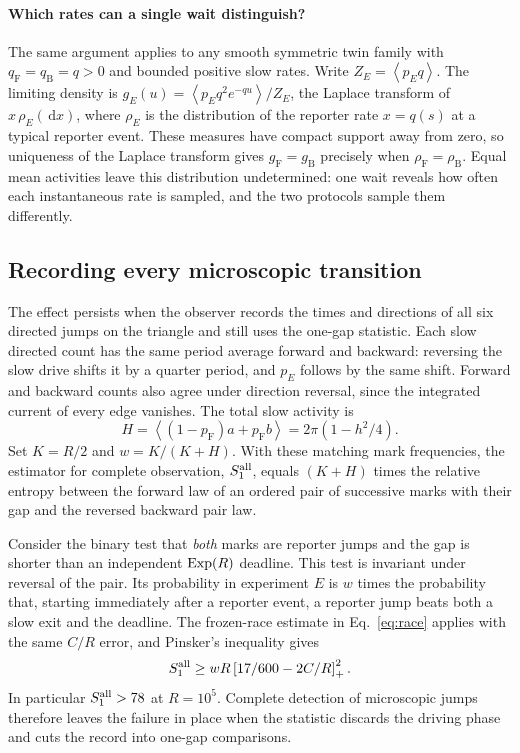 \documentclass[11pt,a4paper]{article}
\newcommand{\av}[1]{\left\langle #1\right\rangle}
\newcommand{\F}{\mathrm F}
\newcommand{\B}{\mathrm B}
\newcommand{\pos}[1]{\left[#1\right]_+}
\newcommand{\dd}{\,\mathrm d}
\begin{document}
\paragraph{Which rates can a single wait distinguish?} The same argument applies to any smooth symmetric twin family with $q_\F=q_\B=q>0$ and bounded positive slow rates. Write $Z_E=\av{p_E q}$. The limiting density is $g_E(u)=\av{p_E q^2e^{-qu}}/Z_E$, the Laplace transform of $x\,\rho_E(\dd x)$, where $\rho_E$ is the distribution of the reporter rate $x=q(s)$ at a typical reporter event. These measures have compact support away from zero, so uniqueness of the Laplace transform gives $g_\F=g_\B$ precisely when $\rho_\F=\rho_\B$. Equal mean activities leave this distribution undetermined: one wait reveals how often each instantaneous rate is sampled, and the two protocols sample them differently.

\subsection*{Recording every microscopic transition}
The effect persists when the observer records the times and directions of all six directed jumps on the triangle and still uses the one-gap statistic. Each slow directed count has the same period average forward and backward: reversing the slow drive shifts it by a quarter period, and $p_E$ follows by the same shift. Forward and backward counts also agree under direction reversal, since the integrated current of every edge vanishes. The total slow activity is
\[
 H=\av{(1-p_\F)a+p_\F b}=2\pi(1-h^2/4).
\]
Set $K=R/2$ and $w=K/(K+H)$. With these matching mark frequencies, the estimator for complete observation, $S_1^{\rm all}$, equals $(K+H)$ times the relative entropy between the forward law of an ordered pair of successive marks with their gap and the reversed backward pair law.

Consider the binary test that \emph{both} marks are reporter jumps and the gap is shorter than an independent ${\rm Exp}(R)$ deadline. This test is invariant under reversal of the pair. Its probability in experiment $E$ is $w$ times the probability that, starting immediately after a reporter event, a reporter jump beats both a slow exit and the deadline. The frozen-race estimate in Eq.~\eqref{eq:race} applies with the same $C/R$ error, and Pinsker's inequality gives
\[
 S_1^{\rm all}\geq wR\pos{17/600-2C/R}^2 .
\]
In particular $S_1^{\rm all}>78$ at $R=10^5$. Complete detection of microscopic jumps therefore leaves the failure in place when the statistic discards the driving phase and cuts the record into one-gap comparisons.
\end{document}

